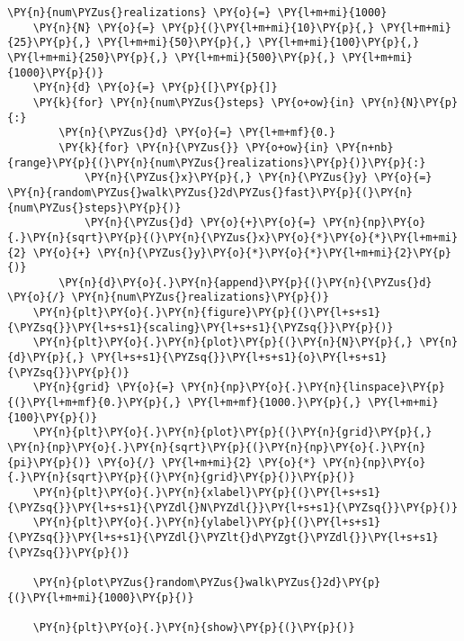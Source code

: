 \begin{Verbatim}[label=\makebox{\href{https://github.com/unipi-physics-labs/lab1-sheets/tree/main/snippy/random_walk.py}{https://github.com/.../random\_walk.py}},commandchars=\\\{\}]
    \PY{n}{num\PYZus{}realizations} \PY{o}{=} \PY{l+m+mi}{1000}
    \PY{n}{N} \PY{o}{=} \PY{p}{(}\PY{l+m+mi}{10}\PY{p}{,} \PY{l+m+mi}{25}\PY{p}{,} \PY{l+m+mi}{50}\PY{p}{,} \PY{l+m+mi}{100}\PY{p}{,} \PY{l+m+mi}{250}\PY{p}{,} \PY{l+m+mi}{500}\PY{p}{,} \PY{l+m+mi}{1000}\PY{p}{)}
    \PY{n}{d} \PY{o}{=} \PY{p}{[}\PY{p}{]}
    \PY{k}{for} \PY{n}{num\PYZus{}steps} \PY{o+ow}{in} \PY{n}{N}\PY{p}{:}
        \PY{n}{\PYZus{}d} \PY{o}{=} \PY{l+m+mf}{0.}
        \PY{k}{for} \PY{n}{\PYZus{}} \PY{o+ow}{in} \PY{n+nb}{range}\PY{p}{(}\PY{n}{num\PYZus{}realizations}\PY{p}{)}\PY{p}{:}
            \PY{n}{\PYZus{}x}\PY{p}{,} \PY{n}{\PYZus{}y} \PY{o}{=} \PY{n}{random\PYZus{}walk\PYZus{}2d\PYZus{}fast}\PY{p}{(}\PY{n}{num\PYZus{}steps}\PY{p}{)}
            \PY{n}{\PYZus{}d} \PY{o}{+}\PY{o}{=} \PY{n}{np}\PY{o}{.}\PY{n}{sqrt}\PY{p}{(}\PY{n}{\PYZus{}x}\PY{o}{*}\PY{o}{*}\PY{l+m+mi}{2} \PY{o}{+} \PY{n}{\PYZus{}y}\PY{o}{*}\PY{o}{*}\PY{l+m+mi}{2}\PY{p}{)}
        \PY{n}{d}\PY{o}{.}\PY{n}{append}\PY{p}{(}\PY{n}{\PYZus{}d} \PY{o}{/} \PY{n}{num\PYZus{}realizations}\PY{p}{)}
    \PY{n}{plt}\PY{o}{.}\PY{n}{figure}\PY{p}{(}\PY{l+s+s1}{\PYZsq{}}\PY{l+s+s1}{scaling}\PY{l+s+s1}{\PYZsq{}}\PY{p}{)}
    \PY{n}{plt}\PY{o}{.}\PY{n}{plot}\PY{p}{(}\PY{n}{N}\PY{p}{,} \PY{n}{d}\PY{p}{,} \PY{l+s+s1}{\PYZsq{}}\PY{l+s+s1}{o}\PY{l+s+s1}{\PYZsq{}}\PY{p}{)}
    \PY{n}{grid} \PY{o}{=} \PY{n}{np}\PY{o}{.}\PY{n}{linspace}\PY{p}{(}\PY{l+m+mf}{0.}\PY{p}{,} \PY{l+m+mf}{1000.}\PY{p}{,} \PY{l+m+mi}{100}\PY{p}{)}
    \PY{n}{plt}\PY{o}{.}\PY{n}{plot}\PY{p}{(}\PY{n}{grid}\PY{p}{,} \PY{n}{np}\PY{o}{.}\PY{n}{sqrt}\PY{p}{(}\PY{n}{np}\PY{o}{.}\PY{n}{pi}\PY{p}{)} \PY{o}{/} \PY{l+m+mi}{2} \PY{o}{*} \PY{n}{np}\PY{o}{.}\PY{n}{sqrt}\PY{p}{(}\PY{n}{grid}\PY{p}{)}\PY{p}{)}
    \PY{n}{plt}\PY{o}{.}\PY{n}{xlabel}\PY{p}{(}\PY{l+s+s1}{\PYZsq{}}\PY{l+s+s1}{\PYZdl{}N\PYZdl{}}\PY{l+s+s1}{\PYZsq{}}\PY{p}{)}
    \PY{n}{plt}\PY{o}{.}\PY{n}{ylabel}\PY{p}{(}\PY{l+s+s1}{\PYZsq{}}\PY{l+s+s1}{\PYZdl{}\PYZlt{}d\PYZgt{}\PYZdl{}}\PY{l+s+s1}{\PYZsq{}}\PY{p}{)}

    \PY{n}{plot\PYZus{}random\PYZus{}walk\PYZus{}2d}\PY{p}{(}\PY{l+m+mi}{1000}\PY{p}{)}

    \PY{n}{plt}\PY{o}{.}\PY{n}{show}\PY{p}{(}\PY{p}{)}
\end{Verbatim}
